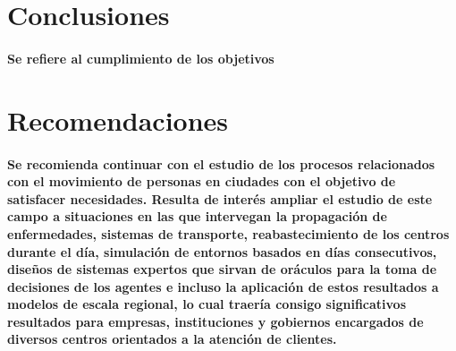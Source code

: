 \documentclass[12pt]{amsart}
\begin{document}
\section{Conclusiones}

\paragraph{Se refiere al cumplimiento de los objetivos}

\section{Recomendaciones}

\paragraph{Se recomienda continuar con el estudio de los procesos relacionados con el movimiento de personas en ciudades con el objetivo de satisfacer necesidades. Resulta de interés ampliar el estudio de este campo a situaciones en las que intervegan la propagación de enfermedades, sistemas de transporte, reabastecimiento de los centros durante el día, simulación de entornos basados en días consecutivos, diseños de sistemas expertos que sirvan de oráculos para la toma de decisiones de los agentes e incluso la aplicación de estos resultados a modelos de escala regional, lo cual traería consigo significativos resultados para empresas, instituciones y gobiernos encargados de diversos centros orientados a la atención de clientes.}
\end{document}
